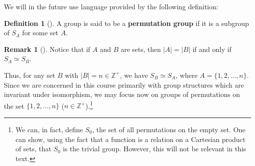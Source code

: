 \documentclass[10pt,]{book}
\newcommand{\terminology}[1]{\textbf{#1}}
\theoremstyle{plain}
\theoremstyle{definition}
\newtheorem{definition}[theorem]{Definition}
\theoremstyle{definition}
\newtheorem{remark}[theorem]{Remark}
\theoremstyle{definition}
\theoremstyle{definition}
\numberwithin{equation}{section}
\def\Z{\mathbb{Z}}
\begin{document}
We will in the future use language provided by the following definition:%
\begin{definition}[{}]\label{definition-45}
A group is said to be a \terminology{permutation group} if it is a subgroup of \(S_A\) for some set \(A\).%
\end{definition}
\begin{remark}[]\label{remark-24}
Notice that if \(A\) and \(B\) are sets, then \(|A|=|B|\) if and only if \(S_A\simeq S_B\).%
\end{remark}
Thus, for any set \(B\) with \(|B|=n \in \Z^+\), we have \(S_B\simeq
S_A\), where \(A=\{1,2,\ldots,n\}\). Since we are concerned in this course primarily with group structures which are invariant under isomorphism, we may focus now on groups of permutations on the set \(\{1,2,\ldots, n\}\) (\(n\in \Z^+\)).\footnote{We can, in fact,  define \(S_0\), the set of all permutations on the empty set. One can show, using the fact that a function is a relation on a Cartesian product of sets, that \(S_0\) is the trivial group. However, this will not be relevant in this text.\label{fn-3}}%
\typeout{************************************************}
\typeout{************************************************}
\end{document}
